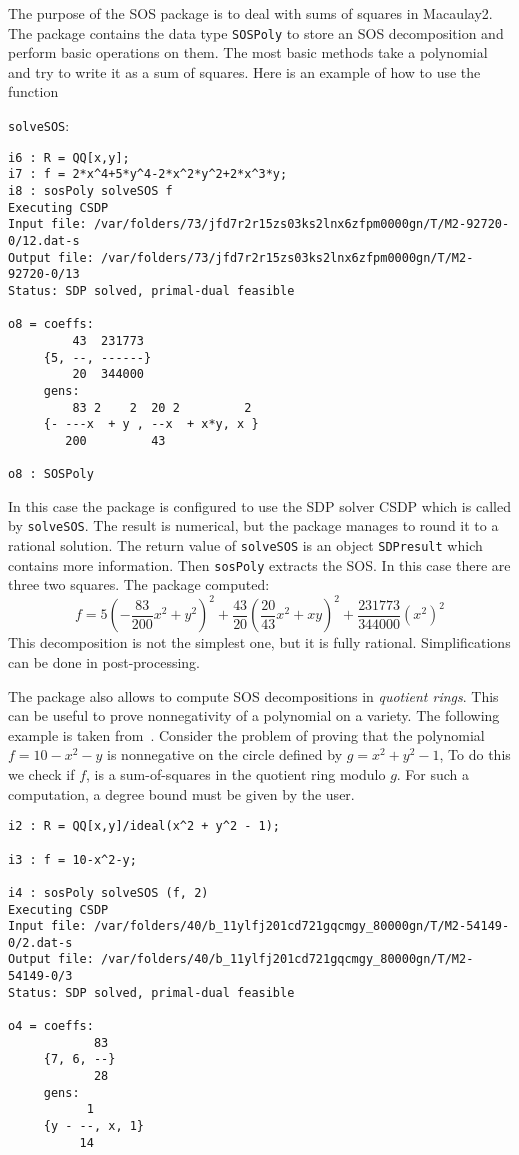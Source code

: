 \documentclass[11pt]{amsart}
\theoremstyle{plain}%
\theoremstyle{definition}
\theoremstyle{remark}
\newcommand{\SOS}{\textsc{SOS}\xspace}
\begin{document}
The purpose of the \SOS package is to deal with sums of squares in
Macaulay2.
The package contains the data type \verb|SOSPoly| to store
an SOS decomposition and perform basic operations on them.
The most basic methods take a polynomial and try to write it as a sum
of squares.
Here is an example of how to use the function
{\small
\verb|solveSOS|:
\begin{verbatim}
i6 : R = QQ[x,y];
i7 : f = 2*x^4+5*y^4-2*x^2*y^2+2*x^3*y;
i8 : sosPoly solveSOS f
Executing CSDP
Input file: /var/folders/73/jfd7r2r15zs03ks2lnx6zfpm0000gn/T/M2-92720-0/12.dat-s
Output file: /var/folders/73/jfd7r2r15zs03ks2lnx6zfpm0000gn/T/M2-92720-0/13
Status: SDP solved, primal-dual feasible

o8 = coeffs:
         43  231773
     {5, --, ------}
         20  344000
     gens:
         83 2    2  20 2         2
     {- ---x  + y , --x  + x*y, x }
        200         43

o8 : SOSPoly
\end{verbatim}
}
In this case the package is configured to use the SDP solver CSDP
which is called by \verb|solveSOS|.
The result is numerical, but the package manages to round it to a rational solution.
The return value of \verb|solveSOS| is an object \verb|SDPresult| which contains more information.
Then \verb|sosPoly| extracts the SOS.
In this case there are three two squares.
The package computed:
\[
  f = 5(-\frac{83}{200} x^{2}+y^{2})^{2} + \frac{43}{20}
  (\frac{20}{43}x^{2} + xy)^{2} + \frac{231773}{344000} (x^{2})^{2}
\]
This decomposition is not the simplest one, but it is fully rational. 
Simplifications can be done in post-processing.

The package also allows to compute SOS decompositions in \emph{quotient rings}.
This can be useful to prove nonnegativity of a polynomial on a variety.  
The following example is taken from~\cite{parrilo2005exploiting}.  
Consider the problem of proving that the polynomial $f = 10-x^2-y$ is nonnegative on the circle defined by $g = x^2 + y^2 - 1$,
To do this we check if $f$, is a sum-of-squares in the quotient ring modulo $g$.
For such a computation, a degree bound must be given by the user.
{\small
\begin{verbatim}
i2 : R = QQ[x,y]/ideal(x^2 + y^2 - 1);

i3 : f = 10-x^2-y;

i4 : sosPoly solveSOS (f, 2)
Executing CSDP
Input file: /var/folders/40/b_11ylfj201cd721gqcmgy_80000gn/T/M2-54149-0/2.dat-s
Output file: /var/folders/40/b_11ylfj201cd721gqcmgy_80000gn/T/M2-54149-0/3
Status: SDP solved, primal-dual feasible

o4 = coeffs:
            83
     {7, 6, --}
            28
     gens:
           1
     {y - --, x, 1}
          14
\end{verbatim}
}
\end{document}
